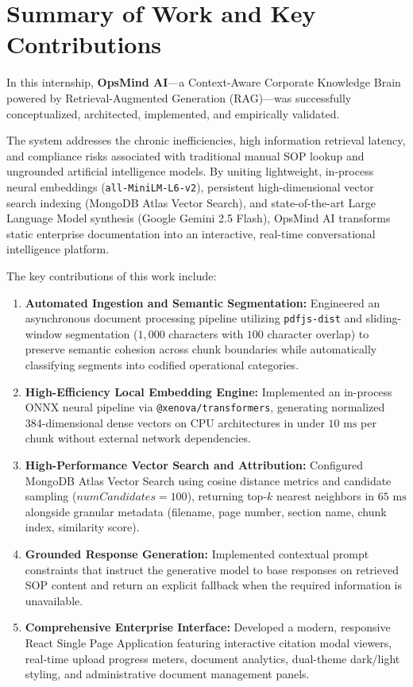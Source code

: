 \section{Summary of Work and Key Contributions}
\label{sec:concl_summary}

In this internship, \textbf{OpsMind AI}—a Context-Aware Corporate Knowledge Brain powered by Retrieval-Augmented Generation (RAG)—was successfully conceptualized, architected, implemented, and empirically validated.

The system addresses the chronic inefficiencies, high information retrieval latency, and compliance risks associated with traditional manual SOP lookup and ungrounded artificial intelligence models. By uniting lightweight, in-process neural embeddings (\texttt{all-MiniLM-L6-v2}), persistent high-dimensional vector search indexing (MongoDB Atlas Vector Search), and state-of-the-art Large Language Model synthesis (Google Gemini 2.5 Flash), OpsMind AI transforms static enterprise documentation into an interactive, real-time conversational intelligence platform.

The key contributions of this work include:
\begin{enumerate}
    \item \textbf{Automated Ingestion and Semantic Segmentation:} Engineered an asynchronous document processing pipeline utilizing \texttt{pdfjs-dist} and sliding-window segmentation ($1,000$ characters with $100$ character overlap) to preserve semantic cohesion across chunk boundaries while automatically classifying segments into codified operational categories.
    \item \textbf{High-Efficiency Local Embedding Engine:} Implemented an in-process ONNX neural pipeline via \texttt{@xenova/transformers}, generating normalized 384-dimensional dense vectors on CPU architectures in under $10\text{ ms}$ per chunk without external network dependencies.
    \item \textbf{High-Performance Vector Search and Attribution:} Configured MongoDB Atlas Vector Search using cosine distance metrics and candidate sampling ($numCandidates = 100$), returning top-$k$ nearest neighbors in $65\text{ ms}$ alongside granular metadata (filename, page number, section name, chunk index, similarity score).
    \item \textbf{Grounded Response Generation:} Implemented contextual prompt constraints that instruct the generative model to base responses on retrieved SOP content and return an explicit fallback when the required information is unavailable.
    \item \textbf{Comprehensive Enterprise Interface:} Developed a modern, responsive React Single Page Application featuring interactive citation modal viewers, real-time upload progress meters, document analytics, dual-theme dark/light styling, and administrative document management panels.
\end{enumerate}

